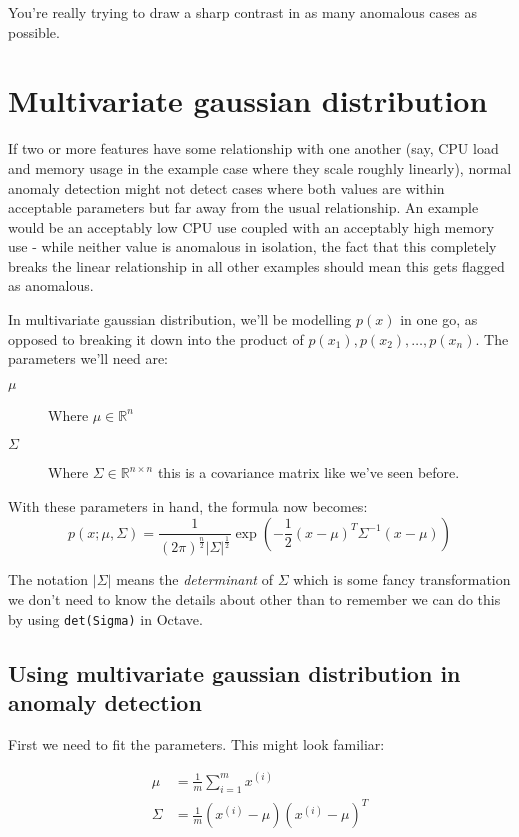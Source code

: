 You're really trying to draw a sharp contrast in as many anomalous cases as possible.

\section{Multivariate gaussian distribution}

If two or more features have some relationship with one another (say, CPU load and memory usage in the example case where they scale roughly linearly), normal anomaly detection might not detect cases where both values are within acceptable parameters but far away from the usual relationship. An example would be an acceptably low CPU use coupled with an acceptably high memory use - while neither value is anomalous in isolation, the fact that this completely breaks the linear relationship in all other examples should mean this gets flagged as anomalous.

In multivariate gaussian distribution, we'll be modelling $p(x)$ in one go, as opposed to breaking it down into the product of $p(x_1), p(x_2), \dots, p(x_n)$.
The parameters we'll need are: 
\begin{description}
\item[$\mu$] Where $\mu \in \mathbb{R}^n$
\item[$\Sigma$] Where $\Sigma \in \mathbb{R}^{n \times n}$ this is a covariance matrix like we've seen before.
\end{description}

With these parameters in hand, the formula now becomes:
\[
p(x; \mu, \Sigma) = 
\frac{1}{(2\pi)^{\frac{n}{2}} |\Sigma|^{\frac{1}{2}} }
\exp{\left(
-\frac{1}{2}(x - \mu)^T \Sigma^{-1}(x-\mu)
\right)}
\]

The notation $|\Sigma|$ means the \emph{determinant} of $\Sigma$ which is some fancy transformation we don't need to know the details about other than to remember we can do this by using \texttt{det(Sigma)} in Octave.

\subsection{Using multivariate gaussian distribution in anomaly detection}

First we need to fit the parameters. This might look familiar:

\begin{align*}
\mu 			&= \frac{1}{m}\sum^m_{i = 1}x^{(i)} \\
\Sigma		&= \frac{1}{m}(x^{(i)} - \mu)(x^{(i)}-\mu)^T
\end{align*}

